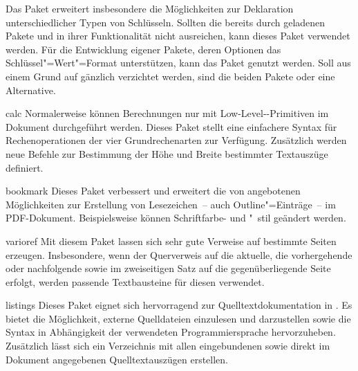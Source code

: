\begin{packages}
  Das Paket  erweitert insbesondere die Möglichkeiten zur 
  Deklaration unterschiedlicher Typen von Schlüsseln. Sollten die bereits durch 
  \TUDScript geladenen Pakete  und  in ihrer 
  Funktionalität nicht ausreichen, kann dieses Paket verwendet werden. Für die 
  Entwicklung eigener Pakete, deren Optionen das Schlüssel"=Wert"=Format 
  unterstützen, kann das Paket  genutzt werden. Soll aus einem 
  Grund auf \KOMAScript{} gänzlich verzichtet werden, sind die beiden Pakete 
   oder  eine Alternative.
\item[calc]
  Normalerweise können Berechnungen nur mit Low-Level--Primitiven 
  im Dokument durchgeführt werden. Dieses Paket stellt eine einfachere Syntax 
  für Rechenoperationen der vier Grundrechenarten zur Verfügung. Zusätzlich 
  werden neue Befehle zur Bestimmung der Höhe und Breite bestimmter Textauszüge 
  definiert.
\item[bookmark]
  Dieses Paket verbessert und erweitert die von  angebotenen 
  Möglichkeiten zur Erstellung von Lesezeichen~-- auch Outline"=Einträge~-- im 
  PDF-Dokument. Beispielsweise können Schriftfarbe- und "~stil geändert werden.
\item[varioref]
  Mit diesem Paket lassen sich sehr gute Verweise auf bestimmte Seiten 
  erzeugen. Insbesondere, wenn der Querverweis auf die aktuelle, die 
  vorhergehende oder nachfolgende sowie im zweiseitigen Satz auf die 
  gegenüberliegende Seite erfolgt, werden passende Textbausteine für diesen 
  verwendet.
\item[listings]%
  Dieses Paket eignet sich hervorragend zur Quelltextdokumentation in 
  . Es bietet die Möglichkeit, externe Quelldateien einzulesen 
  und darzustellen sowie die Syntax in Abhängigkeit der verwendeten 
  Programmiersprache hervorzuheben. Zusätzlich lässt sich ein Verzeichnis mit 
  allen eingebundenen sowie direkt im Dokument angegebenen Quelltextauszügen 
  erstellen.
  

\end{packages}
